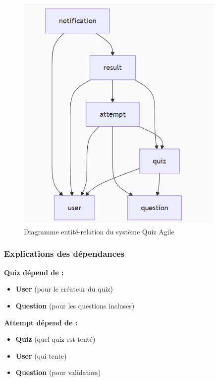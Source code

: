 \documentclass[12pt,a4paper]{report}
\begin{document}
\begin{figure}[htbp]
    \centering
    \includegraphics[width=0.9\textwidth]{latex_media/media/Diagramme entite-relation.png}
    \caption{Diagramme entité-relation du système Quiz Agile}
    \label{fig:diagramme-entite-relation}
\end{figure}

\subsubsection{Explications des dépendances}

\textbf{Quiz dépend de :}
\begin{itemize}
    \item \textbf{User} (pour le créateur du quiz)
    \item \textbf{Question} (pour les questions incluses)
\end{itemize}

\textbf{Attempt dépend de :}
\begin{itemize}
    \item \textbf{Quiz} (quel quiz est tenté)
    \item \textbf{User} (qui tente)
    \item \textbf{Question} (pour validation)
\end{itemize}
\end{document}
